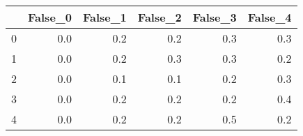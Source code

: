 \begin{tabular}{lrrrrr}
\toprule
{} &  False\_0 &  False\_1 &  False\_2 &  False\_3 &  False\_4 \\ \hline
\midrule
0 &      0.0 &      0.2 &      0.2 &      0.3 &      0.3 \\ \hline
1 &      0.0 &      0.2 &      0.3 &      0.3 &      0.2 \\ \hline
2 &      0.0 &      0.1 &      0.1 &      0.2 &      0.3 \\ \hline
3 &      0.0 &      0.2 &      0.2 &      0.2 &      0.4 \\ \hline
4 &      0.0 &      0.2 &      0.2 &      0.5 &      0.2 \\ \hline
\bottomrule
\end{tabular}
